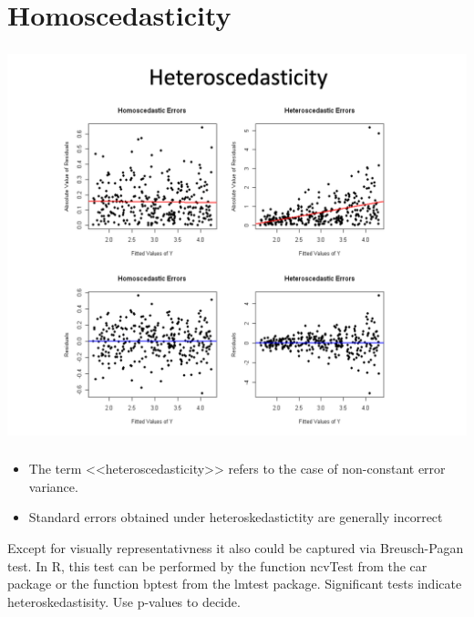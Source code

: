 \documentclass[t, 11pt]{beamer}
\begin{document}
	\section{Homoscedasticity}
\begin{frame} 
	\frametitle{\insertsection} 
	 \begin{center}
	\includegraphics[scale=0.25]{hetero}
\end{center}
\end{frame}	

\begin{frame} 
	\frametitle{\insertsection} 
	\begin{itemize}
 		\item The term <<heteroscedasticity>> refers to the case of non-constant error variance. 
 		\item Standard errors obtained under heteroskedastictity are generally incorrect
 	\end{itemize}
	 Except for visually representativness it also could be captured via Breusch-Pagan test. In R, this test can be performed by the function ncvTest from the car package or the function bptest from the lmtest package. Significant tests indicate heteroskedastisity. Use p-values to decide. 
\end{frame}	
\end{document}
